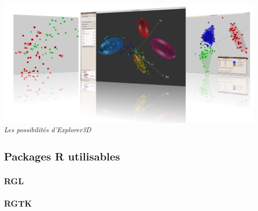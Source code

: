\begin{center}
\includegraphics[scale=0.3]{explorer.png}\\
\textit{Les possibilités d'Explorer3D}
\end{center}


\newpage
\subsection{Packages R utilisables}
\subsubsection{RGL}

\newpage
\subsubsection{RGTK}

\newpage